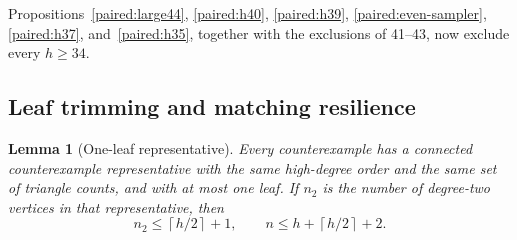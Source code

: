 \documentclass[11pt,a4paper]{article}
\newtheorem{lemma}[theorem]{Lemma}
\theoremstyle{definition}\newtheorem{definition}[theorem]{Definition}
\theoremstyle{remark}\newtheorem{remark}[theorem]{Remark}
\newcommand{\ceil}[1]{\left\lceil#1\right\rceil}
\begin{document}
Propositions~\ref{paired:large44}, \ref{paired:h40}, \ref{paired:h39},
\ref{paired:even-sampler}, \ref{paired:h37}, and~\ref{paired:h35},
together with the exclusions of 41--43, now exclude every $h\ge34$.

\subsection{Leaf trimming and matching resilience}
\label{paired:trimming-section}

\begin{lemma}[One-leaf representative]\label{paired:trim}
Every counterexample has a connected counterexample representative
with the same high-degree order and the same set of triangle counts,
and with at most one leaf. If $n_2$ is the number of degree-two
vertices in that representative, then
\begin{equation}\label{paired:rough-order}
 n_2\le\ceil{h/2}+1,
 \qquad n\le h+\ceil{h/2}+2.
\end{equation}
\end{lemma}
\end{document}
